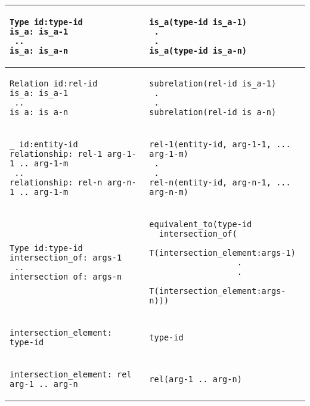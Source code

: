 \begin{scriptsize}
\begin{longtable}{ | p{7cm} | p{7cm} |}
\hline
\begin{verbatim}
Type id:type-id
is_a: is_a-1
 ..
is_a: is_a-n
\end{verbatim}
&
\begin{verbatim}
is_a(type-id is_a-1)
 .
 .
is_a(type-id is_a-n)
\end{verbatim}
\\

\hline
\begin{verbatim}
Relation id:rel-id
is_a: is_a-1
 ..
is_a: is_a-n
\end{verbatim}
&
\begin{verbatim}
subrelation(rel-id is_a-1)
 .
 .
subrelation(rel-id is_a-n)
\end{verbatim}
\\

\hline
\begin{verbatim}
_ id:entity-id
relationship: rel-1 arg-1-1 .. arg-1-m
 ..
relationship: rel-n arg-n-1 .. arg-1-m
\end{verbatim}
&
\begin{verbatim}
rel-1(entity-id, arg-1-1, ... arg-1-m)
 .
 .
rel-n(entity-id, arg-n-1, ... arg-n-m)
\end{verbatim}
\\

\hline
\begin{verbatim}
Type id:type-id
intersection_of: args-1
 ..
intersection_of: args-n
\end{verbatim}
&
\begin{verbatim}
equivalent_to(type-id 
  intersection_of(
    T(intersection_element:args-1)
                  .
                  .
    T(intersection_element:args-n)))

\end{verbatim}
\\

\hline
\begin{verbatim}
intersection_element: type-id
\end{verbatim}
&
\begin{verbatim}
type-id
\end{verbatim}
\\

\hline
\begin{verbatim}
intersection_element: rel arg-1 .. arg-n
\end{verbatim}
&
\begin{verbatim}
rel(arg-1 .. arg-n)
\end{verbatim}
\\


\end{longtable}
\end{scriptsize}
